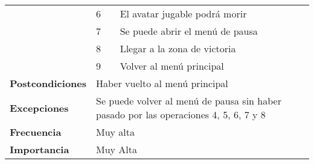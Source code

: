 \begin{longtable}{lll}
\multicolumn{1}{l|}{}                            & 6                                     & El avatar jugable podrá morir                                                                          \\
\multicolumn{1}{l|}{}                            & 7                                     & Se puede abrir el menú de pausa                                                                        \\
\multicolumn{1}{l|}{}                            & 8                                     & Llegar a la zona de victoria                                                                           \\
\multicolumn{1}{l|}{}                            & 9                                     & Volver al menú principal                                                                               \\ \hline
\textbf{Postcondiciones}                         & \multicolumn{2}{l}{Haber vuelto al menú principal}                                                                                             \\ \hline
\textbf{Excepciones}                             & \multicolumn{2}{l}{Se puede volver al menú de pausa sin haber pasado por las operaciones 4, 5, 6, 7 y 8}                                       \\ \hline
\textbf{Frecuencia}                              & \multicolumn{2}{l}{Muy alta}                                                                                                                   \\ \hline
\textbf{Importancia}                             & \multicolumn{2}{l}{Muy Alta}                                                                                                                   \\ \hline
\end{longtable}

